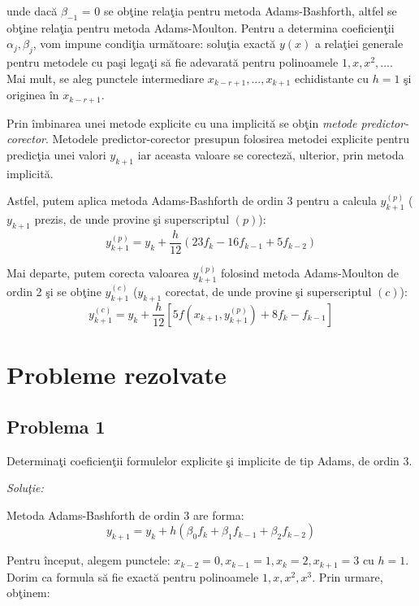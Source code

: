 \documentclass{exam}
\begin{document}
\noindent unde dacă $\beta_{-1}$ = 0 se obţine relaţia pentru metoda Adams-Bashforth, altfel se obţine relaţia pentru metoda Adams-Moulton. Pentru a determina coeficienţii ${\alpha_j}, {\beta_j}$, vom impune condiţia următoare: soluţia exactă $y(x)$ a relaţiei generale pentru metodele cu paşi legaţi să fie adevarată pentru polinoamele $1,x, x^2,...$. Mai mult, se aleg punctele intermediare $x_{k-r+1}, ..., x_{k+1}$ echidistante cu $h = 1$ şi originea în $x_{k-r+1}$.

Prin îmbinarea unei metode explicite cu una implicită se obţin \textit{metode predictor-corector}. Metodele predictor-corector presupun folosirea metodei explicite pentru predicţia unei valori $y_{k+1}$ iar aceasta valoare se corecteză, ulterior, prin metoda implicită.

Astfel, putem aplica metoda Adams-Bashforth de ordin 3 pentru a calcula $y_{k+1}^{(p)}$ ($y_{k+1}$ prezis, de unde provine şi superscriptul $(p)$):
$$y_{k+1}^{(p)} = y_{k} + \frac{h}{12}(23 f_{k} - 16 f_{k-1} + 5 f_{k-2} )$$

Mai departe, putem corecta valoarea $y_{k+1}^{(p)}$ folosind metoda Adams-Moulton de ordin 2 şi se obţine $y_{k+1}^{(c)}$ ($y_{k+1}$ corectat, de unde provine şi superscriptul $(c)$):
$$y_{k+1}^{(c)} = y_{k} + \frac{h}{12}[5f(x_{k+1}, y_{k+1}^{(p)}) + 8f_{k} - f_{k-1}]$$



\section{Probleme rezolvate}

\subsection{Problema 1}

Determinaţi coeficienţii formulelor explicite şi implicite de tip Adams, de ordin 3.

\textit{Soluţie:}

Metoda Adams-Bashforth de ordin 3 are forma:
$$y_{k+1}=y_{k}+h(\beta_{0}f_{k}+\beta_{1}f_{k-1}+\beta_{2}f_{k-2})$$

Pentru început, alegem punctele: $x_{k-2}=0,x_{k-1}=1,x_{k}=2,x_{k+1}=3$ cu $h=1$. Dorim ca formula să fie exactă pentru polinoamele $1, x, x^2, x^3$. Prin urmare, obţinem:
\end{document}
